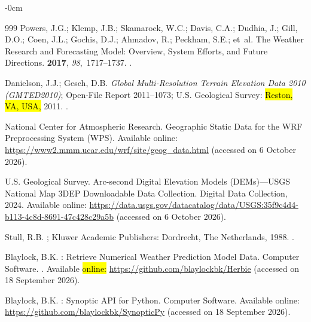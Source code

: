 \documentclass[air,article,accept,moreauthors]{Definitions/mdpi}
\begin{document}
\begin{adjustwidth}{-\extralength}{0cm}
\begin{thebibliography}{999}
Powers, J.G.; Klemp, J.B.; Skamarock, W.C.; Davis, C.A.; Dudhia, J.; Gill, D.O.; Coen, J.L.; Gochis, D.J.; Ahmadov, R.; Peckham, S.E.; et~al.
\newblock The Weather Research and Forecasting Model: Overview, System Efforts, and Future Directions.
 {\bf 2017}, {\em 98},~1717--1737.
.

Danielson, J.J.; Gesch, D.B.
\newblock \emph{Global Multi-Resolution Terrain Elevation Data 2010 ({GMTED2010})};
\newblock Open-File Report 2011--1073; U.S. Geological Survey: \hl{Reston, VA, USA,} 2011.
.

{National Center for Atmospheric Research}.
\newblock Geographic Static Data for the WRF Preprocessing System (WPS).
Available online:
\newblock \url{https://www2.mmm.ucar.edu/wrf/site/geog_data.html} (accessed on 6 October 2026).

{U.S. Geological Survey}.
 Arc-second Digital Elevation Models (DEMs)---USGS National Map 3DEP Downloadable Data Collection.
\newblock Digital Data Collection, 2024.
Available online:
\newblock \url{https://data.usgs.gov/datacatalog/data/USGS:35f9c4d4-b113-4c8d-8691-47c428c29a5b} (accessed on 6 October 2026).

Stull, R.B.
; Kluwer Academic Publishers: Dordrecht, The Netherlands,  1988.
.

Blaylock, B.K.
: Retrieve Numerical Weather Prediction Model Data.
\newblock Computer Software.
.
Available \hl{online:} %
\newblock \url{https://github.com/blaylockbk/Herbie} (accessed on 18 September 2026).

Blaylock, B.K.
: {Synoptic API} for {Python}.
\newblock Computer Software.
Available online:
\newblock \url{https://github.com/blaylockbk/SynopticPy} (accessed on 18 September 2026).


\end{thebibliography}
\end{adjustwidth}
\end{document}
